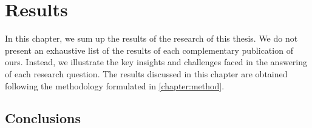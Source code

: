 \chapter{Results} 

In this chapter, we sum up the results of the research of this thesis. We do not present an exhaustive list of the results of each complementary publication of ours. Instead, we illustrate the key insights and challenges faced in the answering of each research question. The results discussed in this chapter are obtained following the methodology formulated in \autoref{chapter:method}.







\section{Conclusions}

\todo{}

